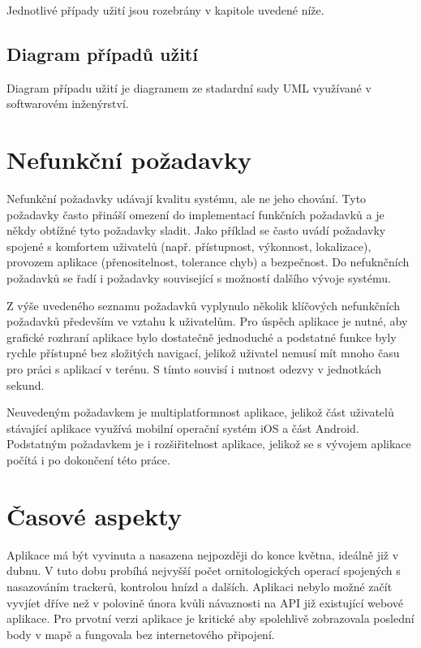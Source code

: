 Jednotlivé případy užití jsou rozebrány v kapitole uvedené níže.

\subsection{Diagram případů užití}

Diagram případu užití je diagramem ze stadardní sady UML využívané v softwarovém inženýrství. 

\section{Nefunkční požadavky}

Nefunkční požadavky udávají kvalitu systému, ale ne jeho chování. Tyto požadavky často přináší omezení do implementací funkčních požadavků a je někdy obtížné tyto požadavky sladit. Jako příklad se často uvádí požadavky spojené s komfortem uživatelů (např. přístupnost, výkonnost, lokalizace), provozem aplikace (přenositelnost, tolerance chyb) a bezpečnost. Do nefuknčních požadavků se řadí i požadavky související s možností dalšího vývoje systému.

Z výše uvedeného seznamu požadavků vyplynulo několik klíčových nefunkčních požadavků především ve vztahu k uživatelům. Pro úspěch aplikace je nutné, aby grafické rozhraní aplikace bylo dostatečně jednoduché a podstatné funkce byly rychle přístupné bez složitých navigací, jelikož uživatel nemusí mít mnoho času pro práci s aplikací v terénu. S tímto souvisí i nutnost odezvy v jednotkách sekund. 

Neuvedeným požadavkem je multiplatformnost aplikace, jelikož část uživatelů stávající aplikace využívá mobilní operační systém iOS a část Android. Podstatným požadavkem je i rozšiřitelnost aplikace, jelikož se s vývojem aplikace počítá i po dokončení této práce. 

\section{Časové aspekty}

Aplikace má být vyvinuta a nasazena nejpozději do konce května, ideálně již v dubnu. V tuto dobu probíhá nejvyšší počet ornitologických operací spojených s nasazováním trackerů, kontrolou hnízd a dalších. Aplikaci nebylo možné začít vyvjíet dříve než v polovině února kvůli návaznosti na API již existující webové aplikace. Pro prvotní verzi aplikace je kritické aby spolehlivě zobrazovala poslední body v mapě a fungovala bez internetového připojení.
